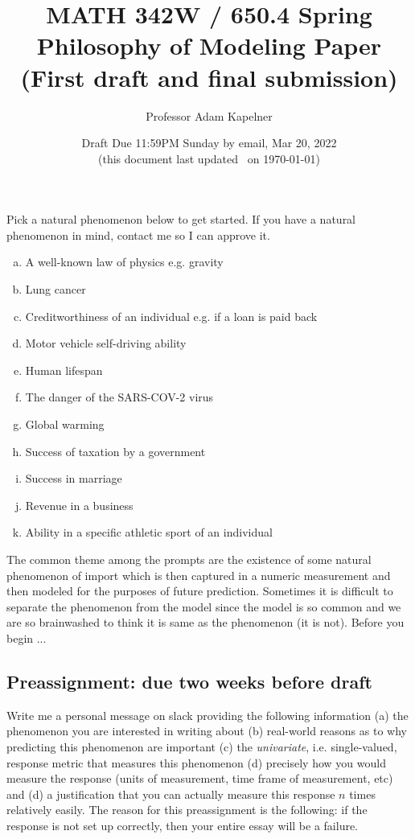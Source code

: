 \documentclass[12pt]{article}
\title{MATH 342W / 650.4 Spring \the\year \\ Philosophy of Modeling Paper \\ (First draft and final submission)}
\author{Professor Adam Kapelner} %
\date{Draft Due 11:59PM Sunday by email, Mar 20, 2022 \\ \vspace{0.5cm} \small (this document last updated \currenttime~on \today)}
\begin{document}
\maketitle

\noindent Pick a natural phenomenon below to get started. If you have a natural phenomenon in mind, contact me so I can approve it.

\begin{enumerate}[(a)]
\item A well-known law of physics e.g. gravity
\item Lung cancer
\item Creditworthiness of an individual e.g. if a loan is paid back
\item Motor vehicle self-driving ability
\item Human lifespan
\item The danger of the SARS-COV-2 virus
\item Global warming
\item Success of taxation by a government
\item Success in marriage
\item Revenue in a business
\item Ability in a specific athletic sport of an individual
\end{enumerate}

The common theme among the prompts are the existence of some natural phenomenon of import which is then captured in a numeric measurement and then modeled for the purposes of future prediction. Sometimes it is difficult to separate the phenomenon from the model since the model is so common and we are so brainwashed to think it is same as the phenomenon (it is not). Before you begin ...

\subsection*{Preassignment: due two weeks before draft}

Write me a personal message on slack providing the following information (a) the phenomenon you are interested in writing about (b) real-world reasons as to why predicting this phenomenon are important (c) the \emph{univariate}, i.e. single-valued, response metric that measures this phenomenon (d) precisely how you would measure the response (units of measurement, time frame of measurement, etc) and (d) a justification that you can actually measure this response $n$ times relatively easily. The reason for this preassignment is the following: if the response is not set up correctly, then your entire essay will be a failure.
\end{document}
